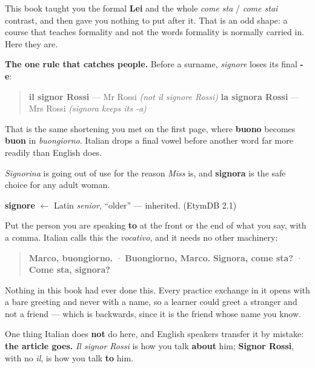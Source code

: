 This book taught you the formal \textbf{Lei} and the whole \emph{come sta} / \emph{come stai} contrast, and then gave you nothing to put after it. That is an odd shape: a course that teaches formality and not the words formality is normally carried in. Here they are.

\textbf{The one rule that catches people.} Before a surname, \emph{signore} loses its final \textbf{-e}:

\begin{quote}
\textbf{il signor Rossi} — Mr Rossi \emph{(not il signore Rossi)} \textbf{la signora Rossi} — Mrs Rossi \emph{(signora keeps its -a)}
\end{quote}

That is the same shortening you met on the first page, where \textbf{buono} becomes \textbf{buon} in \emph{buongiorno}. Italian drops a final vowel before another word far more readily than English does.

\emph{Signorina} is going out of use for the reason \emph{Miss} is, and \textbf{signora} is the safe choice for any adult woman.

\begin{cousinweb}
\textbf{signore} $\leftarrow$ Latin \emph{senior}, \textquotedblleft{}older\textquotedblright{} — inherited. (EtymDB 2.1)
\end{cousinweb}

\begin{grammarlens}[title={Grammar lens: speaking to somebody, by name or by title}]
Put the person you are speaking \textbf{to} at the front or the end of what you say, with a comma. Italian calls this the \emph{vocativo}, and it needs no other machinery:

\begin{quote}
\textbf{Marco, buongiorno.} · \textbf{Buongiorno, Marco.} \textbf{Signora, come sta?} · \textbf{Come sta, signora?}
\end{quote}

Nothing in this book had ever done this. Every practice exchange in it opens with a bare greeting and never with a name, so a learner could greet a stranger and not a friend — which is backwards, since it is the friend whose name you know.

One thing Italian does \textbf{not} do here, and English speakers transfer it by mistake: \textbf{the article goes.} \emph{Il signor Rossi} is how you talk \textbf{about} him; \textbf{Signor Rossi}, with no \emph{il}, is how you talk \textbf{to} him.
\end{grammarlens}

